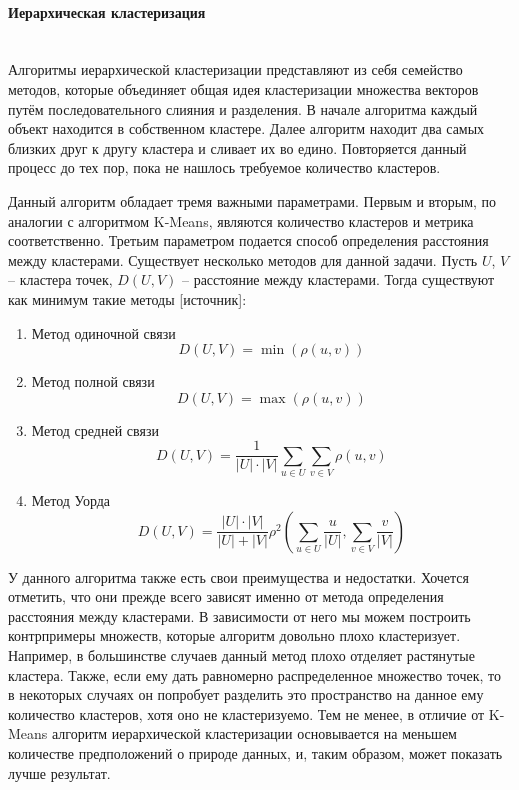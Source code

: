 \paragraph{Иерархическая кластеризация}\mbox{} \\

Алгоритмы иерархической кластеризации представляют из себя семейство методов, которые объединяет общая идея кластеризации множества векторов путём последовательного слияния и разделения. В начале алгоритма каждый объект находится в собственном кластере. Далее алгоритм находит два самых близких друг к другу кластера и сливает их во едино. Повторяется данный процесс до тех пор, пока не нашлось требуемое количество кластеров.

Данный алгоритм обладает тремя важными параметрами. Первым и вторым, по аналогии с алгоритмом K-Means, являются количество кластеров и метрика соответственно. Третьим параметром подается способ определения расстояния между кластерами. Существует несколько методов для данной задачи. Пусть $U$, $V$ -- кластера точек, $D(U, V)$ -- расстояние между кластерами. Тогда существуют как минимум такие методы [источник]:

\begin{enumerate}
    \item Метод одиночной связи $$D(U, V) = \min(\rho(u, v))$$
    \item Метод полной связи $$D(U, V) = \max(\rho(u, v))$$
    \item Метод средней связи $$D(U, V) = \frac{1}{|U| \cdot |V|}\sum_{u \in U} \sum_{v \in V} \rho(u, v)$$
    \item Метод Уорда $$D(U, V) = \frac{|U| \cdot |V|}{|U| + |V|} \rho^2 \left( \sum_{u \in U} \frac{u}{|U|}, \sum_{v \in V} \frac{v}{|V|} \right)$$
\end{enumerate}

У данного алгоритма также есть свои преимущества и недостатки. Хочется отметить, что они прежде всего зависят именно от метода определения расстояния между кластерами. В зависимости от него мы можем построить контрпримеры множеств, которые алгоритм довольно плохо кластеризует. Например, в большинстве случаев данный метод плохо отделяет растянутые кластера.
Также, если ему дать равномерно распределенное множество точек, то в некоторых случаях он попробует разделить это пространство на данное ему количество кластеров, хотя оно не кластеризуемо. Тем не менее, в отличие от K-Means алгоритм иерархической кластеризации основывается на меньшем количестве предположений о природе данных, и, таким образом, может показать лучше результат.

